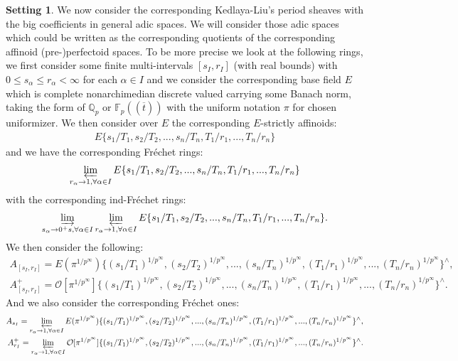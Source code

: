 \documentclass[12pt]{amsart}
\theoremstyle{definition}
\numberwithin{equation}{section}
\newtheorem{setting}[theorem]{Setting}
\begin{document}
\begin{setting}
We now consider the corresponding Kedlaya-Liu's period sheaves with the big coefficients in general adic spaces. We will consider those adic spaces which could be written as the corresponding quotients of the corresponding affinoid (pre-)perfectoid spaces. To be more precise we look at the following rings, we first consider some finite multi-intervals $[s_I,r_I]$ (with real bounds) with $0\leq s_\alpha \leq r_\alpha< \infty$ for each $\alpha \in I$ and we consider the corresponding base field $E$ which is complete nonarchimedian discrete valued carrying some Banach norm, taking the form of $\mathbb{Q}_p$ or $\mathbb{F}_p((\overline{t}))$ with the uniform notation $\pi$ for chosen uniformizer. We then consider over $E$ the corresponding $E$-strictly affinoids:
\begin{align}
E\{s_1/T_1,s_2/T_2,...,s_n/T_n,T_1/r_1,...,T_n/r_n\}	
\end{align}
and we have the corresponding Fr\'echet rings:
\begin{align}
\varprojlim_{r_\alpha \rightarrow 1,\forall \alpha\in I} E\{s_1/T_1,s_2/T_2,...,s_n/T_n,T_1/r_1,...,T_n/r_n\}
\end{align}
with the corresponding ind-Fr\'echet rings:
\begin{align}
\varinjlim_{s_\alpha \rightarrow 0^+s,\forall \alpha\in I}\varprojlim_{r_\alpha \rightarrow 1,\forall \alpha\in I} E\{s_1/T_1,s_2/T_2,...,s_n/T_n,T_1/r_1,...,T_n/r_n\}.
\end{align}
We then consider the following:
\begin{align}
A_{[s_I,r_I]}=E(\pi^{1/p^\infty})\{(s_1/T_1)^{1/p^\infty},(s_2/T_2)^{1/p^\infty},...,(s_n/T_n)^{1/p^\infty},(T_1/r_1)^{1/p^\infty},...,(T_n/r_n)^{1/p^\infty}\}^\wedge,\\
A_{[s_I,r_I]}^+=\mathcal{O}[\pi^{1/p^\infty}]\{(s_1/T_1)^{1/p^\infty},(s_2/T_2)^{1/p^\infty},...,(s_n/T_n)^{1/p^\infty},(T_1/r_1)^{1/p^\infty},...,(T_n/r_n)^{1/p^\infty}\}^\wedge.	
\end{align}
And we also consider the corresponding Fr\'echet ones:
\begin{align}
A_{s_I}= \varprojlim_{r_\alpha \rightarrow 1,\forall \alpha\in I}E(\pi^{1/p^\infty})\{(s_1/T_1)^{1/p^\infty},(s_2/T_2)^{1/p^\infty},...,(s_n/T_n)^{1/p^\infty},(T_1/r_1)^{1/p^\infty},...,(T_n/r_n)^{1/p^\infty}\}^\wedge,\\
A_{r_I}^+= \varprojlim_{r_\alpha \rightarrow 1,\forall \alpha\in I}\mathcal{O}[\pi^{1/p^\infty}]\{(s_1/T_1)^{1/p^\infty},(s_2/T_2)^{1/p^\infty},...,(s_n/T_n)^{1/p^\infty},(T_1/r_1)^{1/p^\infty},...,(T_n/r_n)^{1/p^\infty}\}^\wedge.	
\end{align}
\end{setting}
\end{document}
